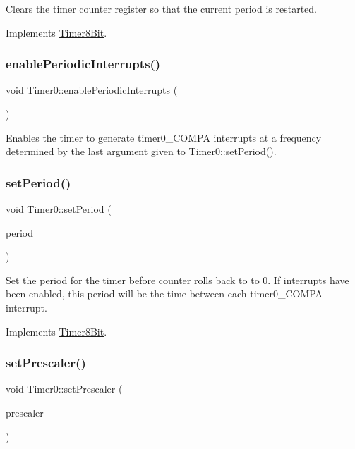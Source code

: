 Clears the timer counter register so that the current period is restarted. 

Implements \mbox{\hyperlink{class_timer8_bit}{Timer8\+Bit}}.

\mbox{\label{class_timer0_a8f0117cda8e82867d58725cf76a73686}} 
\subsubsection{\texorpdfstring{enablePeriodicInterrupts()}{enablePeriodicInterrupts()}}
{\footnotesize\ttfamily void Timer0\+::enable\+Periodic\+Interrupts (\begin{DoxyParamCaption}{ }\end{DoxyParamCaption})}

Enables the timer to generate timer0\+\_\+\+C\+O\+M\+PA interrupts at a frequency determined by the last argument given to \mbox{\hyperlink{class_timer0_af19c7f55137a551a3e9ae1c6b15fd4c5}{Timer0\+::set\+Period()}}. \mbox{\label{class_timer0_af19c7f55137a551a3e9ae1c6b15fd4c5}} 
\subsubsection{\texorpdfstring{setPeriod()}{setPeriod()}}
{\footnotesize\ttfamily void Timer0\+::set\+Period (\begin{DoxyParamCaption}\item[{u8}]{period }\end{DoxyParamCaption})\hspace{0.3cm}{\ttfamily [virtual]}}

Set the period for the timer before counter rolls back to to 0. If interrupts have been enabled, this period will be the time between each timer0\+\_\+\+C\+O\+M\+PA interrupt. 

Implements \mbox{\hyperlink{class_timer8_bit}{Timer8\+Bit}}.

\mbox{\label{class_timer0_aaa42d8cd37a0f9f37d42bd4f1f6c91f8}} 
\subsubsection{\texorpdfstring{setPrescaler()}{setPrescaler()}}
{\footnotesize\ttfamily void Timer0\+::set\+Prescaler (\begin{DoxyParamCaption}\item[{Prescale\+Option}]{prescaler }\end{DoxyParamCaption})\hspace{0.3cm}{\ttfamily [virtual]}}

